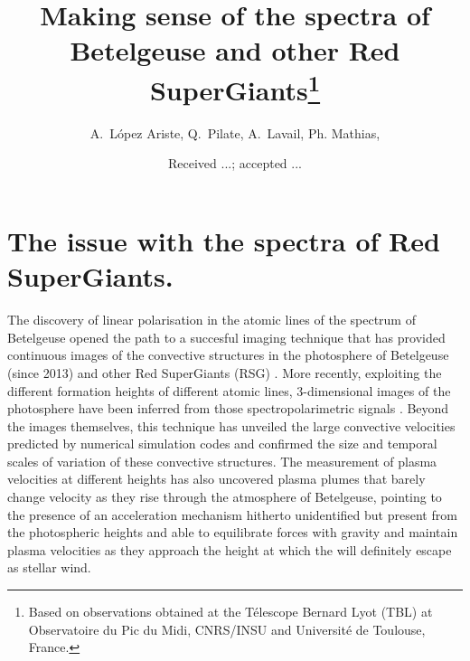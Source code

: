 \documentclass{/Users/art2/TeX/aanda/aa}
\begin{document}
 


   \title{Making sense of the spectra of Betelgeuse and other Red SuperGiants\thanks{Based on observations obtained at the T\'elescope Bernard Lyot
(TBL) at Observatoire du Pic du Midi, CNRS/INSU and Universit\'e de
Toulouse, France.}}

   \author{{ A.~L{\'o}pez Ariste}, { Q.~Pilate},{ A.~Lavail},{ Ph. Mathias},  }
   \date{Received ...; accepted ...}

   

 
  \abstract
  {}
   {}
   {}
   { }
   {}
  
   \keywords{}


   \maketitle
%

\section{The issue with the spectra of Red SuperGiants.}
The discovery of linear polarisation in the atomic lines of the spectrum of Betelgeuse \citep{auriere_discovery_2016}  opened the path to a succesful imaging technique 
that has provided continuous images of the convective structures in the photosphere of Betelgeuse (since 2013) and other Red SuperGiants (RSG) \citep{lopez_ariste_convective_2018}. More recently, exploiting 
the different formation heights of different atomic lines, 3-dimensional images of the photosphere have been inferred from those spectropolarimetric 
signals \citep{lopez_ariste_three-dimensional_2022}. Beyond the images themselves, this technique has unveiled the large convective velocities predicted by numerical simulation codes and confirmed 
the size and temporal scales of variation of these convective structures. The measurement of plasma velocities at different heights has also uncovered 
plasma plumes that barely change velocity as they rise through the atmosphere of Betelgeuse, pointing to the presence of an acceleration mechanism 
hitherto unidentified but present from the photospheric heights and able to equilibrate forces with gravity and maintain plasma velocities as 
they approach the height at which the will definitely escape as stellar wind.
\end{document}
